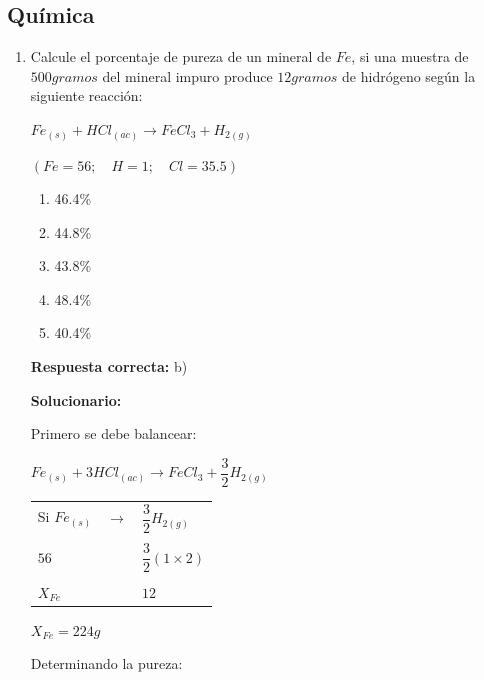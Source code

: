 \subsection*{Química}

\begin{enumerate}[resume]
	
	
	
	
	
	\item Calcule el porcentaje de pureza de un mineral de $Fe$, si una muestra de $500 gramos$ del mineral impuro produce $12 gramos$ de hidrógeno según la siguiente reacción:
	
	$Fe_{(s)} + HCl_{(ac)} \longrightarrow FeCl_3 + H_{2(g)}$
	
	$(Fe = 56; \quad H = 1; \quad Cl = 35.5)$
	
	\begin{enumerate}[label=\alph*)]
		\item 46.4\%
		\item 44.8\%
		\item 43.8\%
		\item 48.4\%
		\item 40.4\%
	\end{enumerate}
	
	\textbf{Respuesta correcta:} b)
	
	\vspace{2mm}
	\textbf{Solucionario:}
	
	Primero se debe balancear: 
	
	$Fe_{(s)} + 3HCl_{(ac)} \rightarrow FeCl_3 + \dfrac{3}{2}H_{2(g)}$
	
	\vspace{2mm}
	\begin{tabular}{l c l}
		Si $Fe_{(s)}$ & \textemdash $\rightarrow$ & $\dfrac{3}{2} H_{2(g)}$ \\\\
		
		
		$56$ & \textemdash & $\dfrac{3}{2}(1 \times 2)$ \\\\
		
		$X_{Fe}$ & \textemdash & $12$ \\
	\end{tabular}
	
	\vspace{1mm}
	$X_{Fe} = 224g$
	
	\vspace{1mm}
	Determinando la pureza: \\
	

\end{enumerate}
